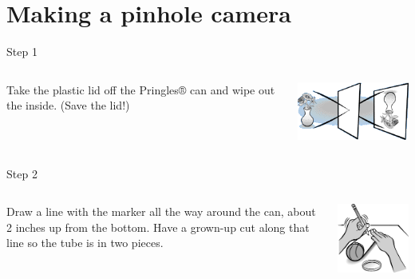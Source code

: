 \section{Making a pinhole camera}
\begin{frame}{Step 1}
  \begin{columns}
    \begin{column}{0.4\textwidth}
      Take the plastic lid off the Pringles® can and wipe out the inside. (Save the lid!)
    \end{column}
    \begin{column}{0.6\textwidth}
      \includegraphics{media/upside_down_vase.png}
    \end{column}
  \end{columns}
\end{frame}

\begin{frame}{Step 2}
  \begin{columns}
    \begin{column}{0.4\textwidth}
Draw a line with the marker all the way around the can, about 2 inches up from the bottom. Have a grown-up cut along that line so the tube is in two pieces.
    \end{column}
    \begin{column}{0.6\textwidth}
      \includegraphics{media/hand_pencil.png}
    \end{column}
  \end{columns}
\end{frame}

